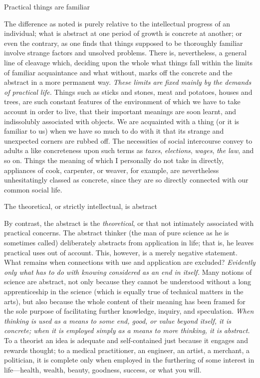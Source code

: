 \documentclass[letterpaper]{book}
\begin{document}
Practical things are familiar

The difference as noted is purely relative to the intellectual progress
of an individual; what is
abstract
at one period of growth is concrete at another; or even the contrary, as
one finds that things supposed to be thoroughly familiar involve strange
factors and unsolved problems. There is, nevertheless, a general line of
cleavage which, deciding upon the whole what things fall within the
limits of familiar acquaintance and what without, marks off the concrete
and the abstract in a more permanent way. \emph{These limits are fixed
mainly by the demands of practical life.} Things such as sticks and
stones, meat and potatoes, houses and trees, are such constant features
of the environment of which we have to take account in order to live,
that their important meanings are soon learnt, and indissolubly
associated with objects. We are acquainted with a thing (or it is
familiar to us) when we have so much to do with it that its strange and
unexpected corners are rubbed off. The necessities of social intercourse
convey to adults a like concreteness upon such terms as \emph{taxes},
\emph{elections}, \emph{wages}, \emph{the law}, and so on. Things the
meaning of which I personally do not take in directly, appliances of
cook, carpenter, or weaver, for example, are nevertheless unhesitatingly
classed as concrete, since they are so directly connected with our
common social life.

The theoretical, or strictly intellectual, is abstract

By contrast, the abstract is the \emph{theoretical}, or that not
intimately associated with practical concerns. The abstract thinker (the
man of pure science as he is sometimes called) deliberately abstracts
from application in life; that is, he leaves practical uses out of
account. This, however, is a merely negative statement. What remains
when connections with use and application are excluded? \emph{Evidently
only what has to do with knowing considered as an end in itself.} Many
notions of
science
are abstract, not only because they cannot be understood without a long
apprenticeship in the science (which is equally true of technical
matters in the arts), but also because the whole content of their
meaning has been framed for the sole purpose of facilitating further
knowledge, inquiry, and speculation. \emph{When thinking is used as a
means to some end, good, or value beyond itself, it is concrete; when it
is employed simply as a means to more thinking, it is abstract.} To a
theorist an idea is adequate and self-contained just because it engages
and rewards thought; to a medical practitioner, an engineer, an artist,
a merchant, a politician, it is complete only when employed in the
furthering of some interest in life---health, wealth, beauty, goodness,
success, or what you will.
\end{document}
